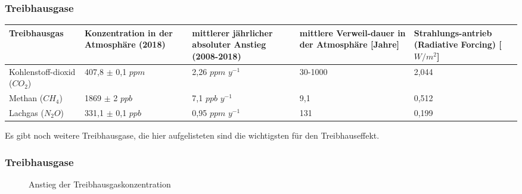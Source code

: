 \begin{frame}
	\frametitle{Treibhausgase}
	
	
	
	\begin{tabular}{p{2.5cm}|p{3cm}|p{3cm}|p{2cm}|p{2cm}}
		Treibhausgas & Konzentration in der Atmosphäre (2018) & mittlerer jährlicher absoluter Anstieg (2008-2018) & mittlere Verweil-dauer in der Atmosphäre [Jahre] & Strahlungs-antrieb (Radiative Forcing) [$W/m^2$] \\ 
		\hline 
		Kohlenstoff-dioxid ($CO_2$) & 407,8 $\pm$ 0,1 $ppm$ & 2,26 $ppm$ $y^{-1}$ &  30-1000 & 2,044 \\ 
		\hline 
		Methan ($CH_4$) & 1869 $\pm$ 2 $ppb$ & 7,1 $ppb$ $y^{-1}$ &9,1 & 0,512  \\ 
		\hline 
		Lachgas ($N_2O$) & 331,1 $\pm$ 0,1 $ppb$ & 0,95 $ppm$ $y^{-1}$ & 131 & 0,199  \\ 
	\end{tabular} 
	 Es gibt noch weitere Treibhausgase, die hier aufgelisteten sind die wichtigsten für den Treibhauseffekt.
	
\end{frame}

\begin{frame}
	\frametitle{Treibhausgase}
	\begin{figure}
		\caption{Anstieg der Treibhausgaskonzentration}
	\end{figure}
\end{frame}

